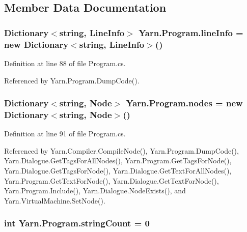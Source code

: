 \subsection{Member Data Documentation}
\hypertarget{a00152_a0d4da395947767b4a1eaaff8a9842adc}{
\subsubsection[{line\-Info}]{\setlength{\rightskip}{0pt plus 5cm}Dictionary$<$string, {\bf Line\-Info}$>$ Yarn.\-Program.\-line\-Info = new Dictionary$<$string, {\bf Line\-Info}$>$()\hspace{0.3cm}{\ttfamily [package]}}}\label{a00152_a0d4da395947767b4a1eaaff8a9842adc}


Definition at line 88 of file Program.\-cs.



Referenced by Yarn.\-Program.\-Dump\-Code().

\hypertarget{a00152_a3f4928a577c88263ad016be259b175c4}{
\subsubsection[{nodes}]{\setlength{\rightskip}{0pt plus 5cm}Dictionary$<$string, {\bf Node}$>$ Yarn.\-Program.\-nodes = new Dictionary$<$string, {\bf Node}$>$()\hspace{0.3cm}{\ttfamily [package]}}}\label{a00152_a3f4928a577c88263ad016be259b175c4}


Definition at line 91 of file Program.\-cs.



Referenced by Yarn.\-Compiler.\-Compile\-Node(), Yarn.\-Program.\-Dump\-Code(), Yarn.\-Dialogue.\-Get\-Tags\-For\-All\-Nodes(), Yarn.\-Program.\-Get\-Tags\-For\-Node(), Yarn.\-Dialogue.\-Get\-Tags\-For\-Node(), Yarn.\-Dialogue.\-Get\-Text\-For\-All\-Nodes(), Yarn.\-Program.\-Get\-Text\-For\-Node(), Yarn.\-Dialogue.\-Get\-Text\-For\-Node(), Yarn.\-Program.\-Include(), Yarn.\-Dialogue.\-Node\-Exists(), and Yarn.\-Virtual\-Machine.\-Set\-Node().

\hypertarget{a00152_a8ef1d10094ef00311aade6715ba78ec7}{
\subsubsection[{string\-Count}]{\setlength{\rightskip}{0pt plus 5cm}int Yarn.\-Program.\-string\-Count = 0\hspace{0.3cm}{\ttfamily [private]}}}\label{a00152_a8ef1d10094ef00311aade6715ba78ec7}



